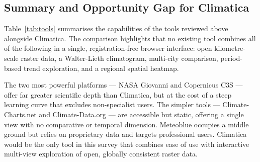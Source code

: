 \subsection{Summary and Opportunity Gap for Climatica}\label{REL_APPS_SUMMARY}

Table~\ref{tab:tools} summarises the capabilities of the tools reviewed above
alongside Climatica. The comparison highlights that no existing tool combines
all of the following in a single, registration-free browser interface: open
kilometre-scale raster data, a Walter-Lieth climatogram, multi-city comparison,
period-based trend exploration, and a regional spatial heatmap.

The two most powerful platforms --- NASA Giovanni and Copernicus C3S --- offer
far greater scientific depth than Climatica, but at the cost of a steep learning
curve that excludes non-specialist users. The simpler tools ---
Climate-Charts.net
and Climate-Data.org --- are accessible but static, offering a single view with
no comparative or temporal dimension. Meteoblue occupies a middle ground but
relies on proprietary data and targets professional users. Climatica would be 
the only tool in this survey that combines ease of use with interactive multi-view
exploration of open, globally consistent raster data.

